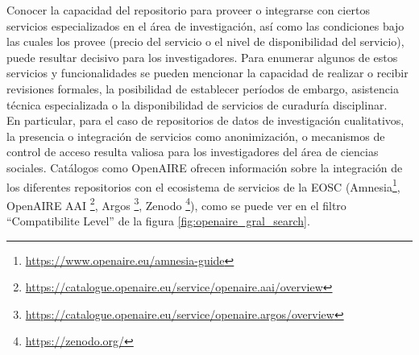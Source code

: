 \documentclass[runningheads]{llncs}
\begin{document}


Conocer la capacidad del repositorio para proveer o integrarse con ciertos servicios especializados en el área de investigación, así como las condiciones bajo las cuales los provee (precio del servicio o el nivel de disponibilidad del servicio), puede resultar decisivo para los investigadores.  
Para enumerar algunos de estos servicios y funcionalidades se pueden mencionar la capacidad de realizar o recibir revisiones formales, la posibilidad de establecer períodos de embargo, asistencia técnica especializada o la disponibilidad de servicios de curaduría disciplinar.\\
En particular, para el caso de repositorios de datos de investigación cualitativos, la presencia o integración de servicios como anonimización, o mecanismos de control de acceso resulta valiosa para los investigadores del área de ciencias sociales. 
Catálogos como OpenAIRE ofrecen información sobre la integración de los diferentes repositorios con el ecosistema de servicios de la EOSC (Amnesia\footnote{\url{https://www.openaire.eu/amnesia-guide}}, OpenAIRE AAI \footnote{\url{https://catalogue.openaire.eu/service/openaire.aai/overview}}, Argos \footnote{\url{https://catalogue.openaire.eu/service/openaire.argos/overview}}, Zenodo \footnote{\url{https://zenodo.org/}}), como se puede ver en el filtro ``Compatibilite Level'' de la figura \ref{fig:openaire_gral_search}.\\
\end{document}
